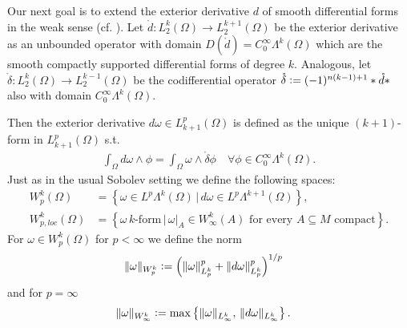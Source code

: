 \documentclass[12pt,a4paper]{article}
\theoremstyle{definition}
\newcommand{\smoothcompforms}[2]{C_0^\infty \Lambda^{#1}(#2)}
\newcommand{\norm}[1]{\lVert #1 \rVert}
\begin{document}
Our next goal is to extend the exterior derivative $d$ 
of smooth differential forms in the weak sense (cf. \cite{goldshtein}). 
Let $\mathring{d}: L^k_2(\Omega) \rightarrow L^{k+1}_2(\Omega)$ be the exterior
derivative as an unbounded operator with domain 
$D(\mathring{d}) = \smoothcompforms{k}{\Omega}$ 
which are the smooth compactly supported differential forms of degree $k$. 
Analogous, let 
$\mathring{\delta}: L^k_2(\Omega) \rightarrow L^{k-1}_2(\Omega)$ be the 
codifferential operator $\mathring{\delta} \vcentcolon= 
(-1)^{n(k-1)+1}*\mathring{d}*$ also with domain $\smoothcompforms{k}{\Omega}$.

Then the exterior derivative $ d\omega \in L^p_{k+1}(\Omega)$ is defined as
the unique $(k+1)$-form in $L^p_{k+1}(\Omega)$ s.t. 
\begin{align*}
\int_\Omega d\omega \wedge \phi = \int_\Omega \omega \wedge 
\mathring{\delta}\phi
\quad \forall \phi \in C_0^\infty \Lambda^{k}(\Omega).
\end{align*}
Just as in the usual Sobolev setting we define the following spaces:
\begin{align*}
W^k_p(\Omega) &= \left\{ \omega \in L^p\Lambda^k(\Omega)\, | 
\, d\omega \in L^p\Lambda^{k+1}(\Omega) \right\}, \\ %
W^k_{p,loc}(\Omega) &= \left\{ \omega \, k \text{-form} \, | \,
\omega|_A \in W^k_\infty(A) \text{ for every } A \subseteq M \text{ compact} 
\right\}.
\end{align*}
For $\omega \in W^k_p(\Omega)$ for $p<\infty$ we define the norm 
\begin{align*}
\lVert \omega \rVert _{W^k_p} &\vcentcolon= 
\left( \norm{\omega}^p_{L^k_p} + \norm{d\omega}^p_{L^k_p} \right)^{1/p}
\end{align*}
and for $p=\infty$
\begin{align*}
    \lVert \omega \rVert _{W^k_\infty} &\vcentcolon= 
    \max\left\{ \norm{\omega}_{L^k_\infty},\, \norm{d\omega}_{L^k_\infty}
    \right\}.
\end{align*}
    
\end{document}
